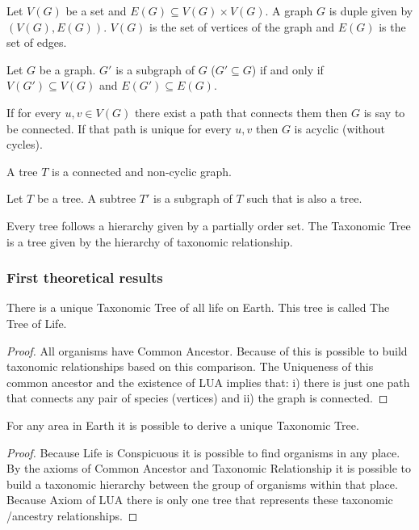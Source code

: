 \begin{definition}
Let $V(G)$ be a set and $E(G) \subseteq V(G) \times V(G) $.
A graph $G$ is duple given by $(V(G),E(G))$.
$V(G)$ is the set of vertices of the graph and $E(G)$ is the set of edges. 
\end{definition}

\begin{definition}
Let $G$ be a graph. $G'$ is a subgraph of $G$ ($G' \subseteq G$) if and only if $V(G') \subseteq V(G)$ and $E(G') \subseteq E(G)$.
\end{definition}

\begin{definition}
If for every $u,v \in V(G)$ there exist a path that connects them then $G$ is say to be connected. If that path is unique for every $u,v$ then $G$ is acyclic (without cycles).    
\end{definition}

\begin{definition}
A tree $T$ is a connected and non-cyclic graph.
\end{definition}
 
\begin{definition}
Let $T$ be a tree. A subtree $T'$ is a subgraph of $T$ such that is also a tree.
\end{definition}


Every tree follows a hierarchy given by a partially order set.
The Taxonomic Tree is a tree given by the hierarchy of taxonomic relationship.

\subsubsection{First theoretical results}

\begin{lemma}
There is a unique Taxonomic Tree of all life on Earth. This tree is called The Tree of Life.
\end{lemma}
\begin{proof}
All organisms have Common Ancestor. Because of this is possible to build taxonomic relationships based on this comparison. The Uniqueness of this common ancestor and the existence of LUA implies that: i) there is just one path that connects any pair of species (vertices) and ii) the graph is connected.
\end{proof}

\begin{lemma} 
For any area in Earth it is possible to derive a unique Taxonomic Tree.
\end{lemma}
\begin{proof}
Because Life is Conspicuous it is possible to find organisms in any place. By the axioms of Common Ancestor and Taxonomic Relationship it is possible to build a taxonomic hierarchy between the group of organisms within that place. Because Axiom of LUA there is only one tree that represents these taxonomic /ancestry relationships.
\end{proof}

